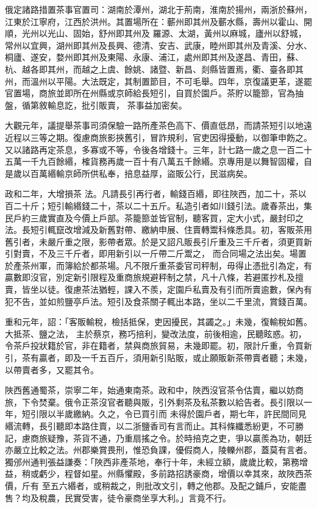 \begin{pinyinscope}
 俄定諸路措置茶事官置司：湖南於潭州，湖北于荊南，淮南於揚州，兩浙於蘇州，江東於江寧府，江西於洪州。其置場所在：蘄州即其州及蘄水縣，壽州以霍山、開順，光州以光山、固始，舒州即其州及
 羅源、太湖，黃州以麻城，廬州以舒城，常州以宜興，湖州即其州及長興、德清、安吉、武康，睦州即其州及青溪、分水、桐廬、遂安，婺州即其州及東陽、永康、浦江，處州即其州及遂昌、青田，蘇、杭、越各即其州，而越之上虞、餘姚、諸暨、新昌、剡縣皆置焉，衢、臺各即其州，而溫州以平陽。大法既定，其制置節目，不可毛舉。四年，京復議更革，遂罷官置場，商旅並即所在州縣或京師給長短引，自買於園戶。茶貯以籠篰，官為抽盤，循第敘輸息訖，批引販賣，
 茶事益加密矣。



 大觀元年，議提舉茶事司須保驗一路所產茶色高下、價直低昂，而請茶短引以地遠近程以三等之期。復慮商旅影挾舊引，冒詐規利，官吏因得擾動，以御筆申飭之。又以諸路再定茶息，多寡或不等，令後各增錢十。三年，計七路一歲之息一百二十五萬一千九百餘緡，榷貨務再歲一百十有八萬五千餘緡。京專用是以舞智固權，自是歲以百萬緡輸京師所供私奉，掊息益厚，盜販公行，民滋病矣。



 政和二年，大增損茶
 法。凡請長引再行者，輸錢百緡，即往陜西，加二十，茶以百二十斤；短引輸緡錢二十，茶以二十五斤。私造引者如川錢引法。歲春茶出，集民戶約三歲實直及今價上戶部。茶籠篰並皆官制，聽客買，定大小式，嚴封印之法。長短引輒竄改增減及新舊對帶、繳納申展、住賣轉鬻科條悉具。初，客販茶用舊引者，未嚴斤重之限，影帶者眾。於是又詔凡販長引斤重及三千斤者，須更買新引對賣，不及三千斤者，即用新引以一斤帶二斤鬻之，
 而合同場之法出矣。場置於產茶州軍，而簿給於都茶場。凡不限斤重茶委官司秤制，毋得止憑批引為定，有贏數即沒官，別定新引限程及重商旅規避秤制之禁，凡十八條，若避匿抄札及擅賣，皆坐以徒。復慮茶法猶輕，課入不羨，定園戶私賣及有引而所賣逾數，保內有犯不告，並如煎鹽亭戶法。短引及食茶關子輒出本路，坐以二千里流，賞錢百萬。



 重和元年，詔：「客販輸稅，檢括抵保，吏因擾民，其蠲之。」未幾，復輸稅如舊。大抵茶、鹽之法，
 主於蔡京，務巧掊利，變改法度，前後相逾，民聽眩惑。初，令茶戶投狀籍於官，非在籍者，禁與商旅貿易，未幾即罷。初，限計斤重，令買新引，茶有贏者，即及一千五百斤，須用新引貼販，或止願販新茶帶賣者聽；未幾，以帶賣者多，又罷其令。



 陜西舊通蜀茶，崇寧二年，始通東南茶。政和中，陜西沒官茶令估賣，繼以妨商旅，下令焚棄。俄令正茶沒官者聽與販，引外剩茶及私茶數以給告者。長引限以一年，短引限以半歲繳納。久之，令已買引而
 未得於園戶者，期七年，許民間同見緡流轉，長引聽即本路住賣，以二浙鹽香司有言而止。其科條纖悉紛更，不可勝記，慮商旅疑豫，茶貨不通，乃重扇搖之令。於時掊克之吏，爭以贏羨為功，朝廷亦嚴立比較之法。州郡樂賞畏刑，惟恐負課，優假商人，陵轢州郡，蓋莫有言者。獨邠州通判張益謙奏：「陜西非產茶地，奉行十年，未經立額，歲歲比較，第務增益，稍或虧少，程督如星。州縣懼殿，多前路招誘豪商，增價以幸其來，故陜西茶價，斤有
 至五六緡者，或稍裁之，則批改文引，轉之他郡。及配之鋪戶，安能盡售？均及稅農，民實受害，徒令豪商坐享大利。」言竟不行。




\end{pinyinscope}
